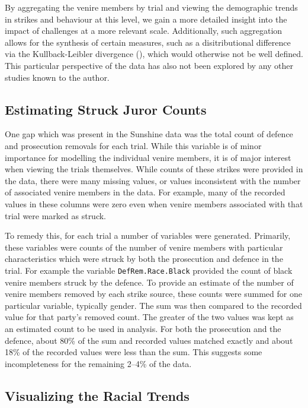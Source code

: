 By aggregating the venire members by trial and viewing the demographic trends in strikes and behaviour at this level, we gain a
more detailed insight into the impact of challenges at a more relevant scale. Additionally, such aggregation allows for the
synthesis of certain measures, such as a disitributional difference via the Kullback-Leibler divergence (\cite{kullback1951}),
which would otherwise not be well defined. This particular perspective of the data has also not been explored by any other studies
known to the author.

\subsection{Estimating Struck Juror Counts} \label{subsec:struckjur}

One gap which was present in the Sunshine data was the total count of defence and prosecution removals for each trial. While this
variable is of minor importance for modelling the individual venire members, it is of major interest when viewing the trials
themselves. While counts of these strikes were provided in the data, there were many missing values, or values inconsistent with
the number of associated venire members in the data. For example, many of the recorded values in these columns were zero even when
venire members associated with that trial were marked as struck.

To remedy this, for each trial a number of variables were generated. Primarily, these variables were counts of the number of
venire members with particular characteristics which were struck by both the prosecution and defence in the trial. For example the
variable \texttt{DefRem.Race.Black} provided the count of black venire members struck by the defence. To provide an estimate of
the number of venire members removed by each strike source, these counts were summed for one particular variable, typically
gender. The sum was then compared to the recorded value for that party's removed count. The greater of the two values was
kept as an estimated count to be used in analysis. For both the prosecution and the defence, about 80\% of the sum and recorded
values matched exactly and about 18\% of the recorded values were less than the sum. This suggests some incompleteness for the
remaining 2--4\% of the data.

\subsection{Visualizing the Racial Trends} \label{subsec:vistrend}

